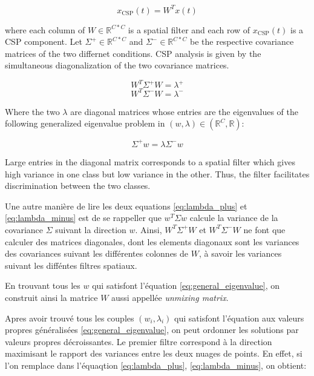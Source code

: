 \begin{equation}
    x_{\text{CSP}}(t) = W^{T}x(t)
\end{equation}

where each column of $W \in \mathbb{R}^{C*C}$ is a spatial filter and each row of $x_{\text{CSP}}(t)$ is a CSP component. Let $\Sigma^{+} \in \mathbb{R}^{C * C}$ and $\Sigma^{-} \in \mathbb{R}^{C * C}$ be the respective covariance matrices of the two differnet  conditions. CSP analysis is given by the simultaneous diagonalization of the two covariance matrices.


\begin{equation}
    W^{T} \Sigma^{+} W = \lambda^{+}
    \label{eq:lambda_plus}
\end{equation}
\begin{equation}
    W^{T} \Sigma^{-} W = \lambda^{-}
    \label{eq:lambda_minus}
\end{equation}

Where the two $\lambda$ are diagonal matrices whose entries are the eigenvalues of the following generalized eigenvalue problem in $(w, \lambda) \in (\mathbb{R}^{C}, \mathbb{R})$:

\begin{equation}
    \Sigma^{+} w = \lambda \Sigma^{-} w
    \label{eq:general_eigenvalue}
\end{equation}

Large entries in the diagonal matrix corresponds to a spatial filter which gives high variance in one class but low variance in the other. Thus, the filter facilitates discrimination between the two classes.


Une autre manière de lire les deux equations \ref{eq:lambda_plus} et \ref{eq:lambda_minus} est de se rappeller que $w^{T}\Sigma w$ calcule la variance de la covariance $\Sigma$ suivant la direction $w$. Ainsi, $W^{T} \Sigma^{+} W$ et $W^{T} \Sigma^{-} W$ ne font que calculer des matrices diagonales, dont les elements diagonaux sont les variances des covariances suivant les différentes colonnes de $W$, à savoir les variances suivant les difféntes filtres spatiaux.

En trouvant tous les $w$ qui satisfont l'équation \ref{eq:general_eigenvalue}, on construit ainsi la matrice $W$ aussi appellée \textit{unmixing matrix}.

Apres avoir trouvé tous les couples $(w_i, \lambda_i)$ qui satisfont l'équation aux valeurs propres généralisées \ref{eq:general_eigenvalue}, on peut ordonner les solutions par valeurs propres décroissantes. Le premier filtre correspond à la direction maximisant le rapport des variances entre les deux nuages de points. En effet, si l'on remplace dans l'équaqtion \ref{eq:lambda_plus}, \ref{eq:lambda_minus}, on obtient:

